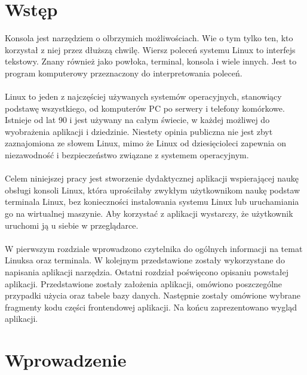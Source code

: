 \documentclass[10pt,a4paper]{report}
\begin{document}
\large 
\newpage
\thispagestyle{empty}
\begin{adjustwidth}{2cm}{2cm}
\tableofcontents
\chapter*{Wstęp}
\begin{minipage}{1\linewidth}
Konsola jest narzędziem o olbrzymich możliwościach. Wie o tym tylko ten, kto korzystał z niej przez dłuższą chwilę. Wiersz poleceń systemu Linux to interfejs tekstowy. Znany również jako powłoka, terminal, konsola i wiele innych. Jest to program komputerowy przeznaczony do interpretowania poleceń. \\ \\
Linux to jeden z najczęściej używanych systemów operacyjnych, stanowiący podstawę wszystkiego, od komputerów PC po serwery i telefony komórkowe. Istnieje od lat 90 i jest używany na całym świecie, w każdej możliwej do wyobrażenia aplikacji i dziedzinie. Niestety opinia publiczna nie jest zbyt zaznajomiona ze słowem Linux, mimo że Linux od dziesięcioleci zapewnia on niezawodność i bezpieczeństwo związane z systemem operacyjnym. \\ \\
Celem niniejszej pracy jest stworzenie dydaktycznej aplikacji wspierającej naukę obsługi konsoli Linux, która uprościłaby zwykłym użytkownikom naukę podstaw terminala Linux, bez konieczności instalowania systemu Linux lub uruchamiania go na wirtualnej maszynie. Aby korzystać z aplikacji wystarczy, że użytkownik uruchomi ją u siebie w przeglądarce. \\ \\
W pierwszym rozdziale wprowadzono czytelnika do ogólnych informacji na temat Linuksa oraz terminala. W kolejnym przedstawione zostały wykorzystane do napisania aplikacji narzędzia.
Ostatni rozdział poświęcono opisaniu powstałej aplikacji. Przedstawione zostały założenia aplikacji, omówiono poszczególne przypadki użycia oraz tabele bazy danych. Następnie zostały omówione wybrane fragmenty kodu części frontendowej aplikacji. Na końcu zaprezentowano wygląd aplikacji.
\end{minipage}
\chapter{Wprowadzenie}

\end{adjustwidth}
\end{document}
